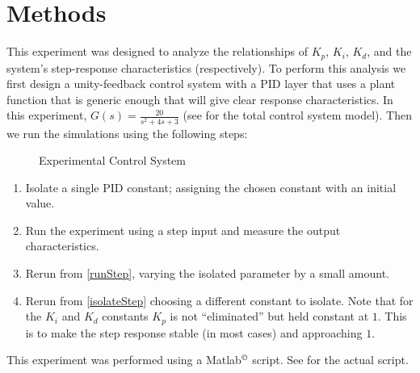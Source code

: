 \documentclass[main.tex]{subfile}
\begin{document}
\section{Methods} 
\label{sec:methods}

This experiment was designed to analyze the relationships of $K_p$, $K_i$,
$K_d$, and the system's step-response characteristics (respectively). To perform
this analysis we first design a unity-feedback control system with a PID layer
that uses a plant function that is generic enough that will give clear response
characteristics. In this experiment, $G(s) = \frac{20}{s^2+4s+3}$ (see
 for the total control system model). Then we run the
simulations using the following steps:

\begin{figure}
  
  \caption{Experimental Control System}
  \label{fig:ctrlSys}
\end{figure}

\begin{enumerate}

  \item \label{isolateStep}
    Isolate a single PID constant; assigning the chosen constant with an initial
    value.

  \item \label{runStep} 
    Run the experiment using a step input and measure the output characteristics.

  \item Rerun from \ref{runStep}, varying the isolated parameter by a small
    amount.

  \item Rerun from \ref{isolateStep} choosing a different constant to isolate.
    Note that for the $K_i$ and $K_d$ constants $K_p$ is not ``eliminated'' but
    held constant at $1$. This is to make the step response stable (in most
    cases) and approaching $1$.
\end{enumerate}

This experiment was performed using a Matlab$^\copyright$ script. See
 for the actual script.

\end{document}
